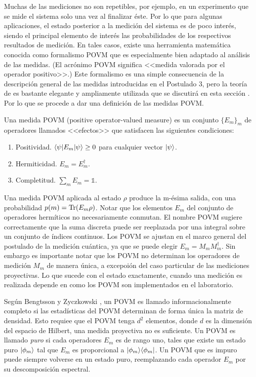 Muchas de las mediciones no son repetibles, por ejemplo, en un experimento que se mide el sistema solo una vez al finalizar éste. Por lo que para algunas aplicaciones, el estado posterior a la medición del sistema es de poco interés, siendo el principal elemento de interés las probabilidades de los respectivos resultados de medición. En tales casos, existe una herramienta matemática conocida como formalismo POVM que es especialmente bien adaptado al análisis de las medidas. (El acrónimo POVM significa <<medida valorada por el operador positivo>>.) Este formalismo es una simple consecuencia de la descripción general de las medidas introducidas en el Postulado 3, pero la teoría de es bastante elegante y ampliamente utilizada que se discutirá en esta sección {\cite{nielsen_chuang_2010}}. Por lo que se procede a dar una definición de las medidas POVM\@.

\begin{definition} Una medida POVM (positive operator-valued measure) es un conjunto $\{E_{m}\} _{m}$ de operadores llamados <<efectos>> que satisfacen las siguientes condiciones:
	\begin{enumerate}
		\item Positividad. $\langle \psi |E_m|\psi \rangle \ge 0 $ para cualquier vector $|\psi\rangle$.
		\item Hermiticidad. $E_m=E_{m}^\dagger$.
		\item  Completitud. $\sum_m E_m =\mathds{1}$.
	\end{enumerate}
\end{definition}

Una medida POVM aplicada al estado $\rho$ produce la m-ésima salida, con una probabilidad $p(m)={\rm Tr}(E_m \rho)$. Notar que los elementos $E_m$ del conjunto de operadores hermíticos no necesariamente conmutan. El nombre POVM sugiere correctamente que la suma discreta puede ser reeplazada por una integral sobre un conjunto de índices continuos. Los POVM se ajustan en el marco general del postulado de la medición cuántica, ya que se puede elegir $E_m=M_m M_m^{\dagger}$. Sin embargo es importante notar que los POVM no determinan los operadores de medición $M_m$ de manera única, a excepoión del caso particular de las mediciones proyectivas. Lo que sucede con el estado exactamente, cuando una medición es realizada depende en como los POVM son implementados en el laboratorio{\cite{2007geometry}}.   

Según Bengtsson y Zyczkowski {\cite{2007geometry}}, un POVM es llamado informacionalmente completo si las estadísticas del POVM determinan de forma única la matriz de densidad. Esto requiee que el POVM tenga $d^2$ elementos, donde $d$ es la dimensión del espacio de Hilbert, una medida proyectiva no es suficiente. Un POVM es llamado \textit{puro} si cada operadores $E_m$ es de rango uno, tales que existe un estado puro $|\phi_m\rangle$ tal que $E_m$ es proporcional a $|\phi_m\rangle \langle\phi_m|$. Un POVM que es impuro puede siempre volverse en un estado puro, reemplazando cada operador $E_m$ por su descomposición espectral. 

